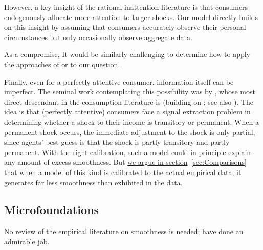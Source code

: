 However, a key insight of the rational inattention literature is that consumers endogenously allocate more attention to larger shocks. Our model directly builds on this insight by assuming that consumers accurately observe their personal circumstances but only occasionally observe aggregate data.

\hypertarget{Gabaix}{}
As a compromise, 
It would be similarly challenging to determine how to apply the approaches of \cite{woodfordImperfect} or \cite{msInertiaAER} to our question. %

Finally, even for a perfectly attentive consumer, information itself can be imperfect.  The seminal work contemplating this possibility was by \cite{muthOptimal}, whose most direct descendant in the consumption literature is \cite{pischkeMicroMacro} (building on \cite{lucas:imperfectInfo}; see also \cite{ludvigson&michaelides:excesses}).  The idea is that (perfectly attentive) consumers face a signal extraction problem in determining whether a shock to their income is transitory or permanent.  When a permanent shock occurs, the immediate adjustment to the shock is only partial, since agents' best guess is that the shock is partly transitory and partly permanent.   With the right calibration, such a model could in principle explain any amount of excess smoothness.  But \hyperlink{MuthLucasPischke}{we argue in section}~\ref{sec:Comparisons} that when a model of this kind is calibrated to the actual empirical data, it generates far less smoothness than exhibited in the data.

\hypertarget{Microfoundations: Empirical and Theoretical}{}
\subsection{Microfoundations}

No review of the empirical literature on smoothness is needed; \cite{hrsHabit} have done an admirable job.

